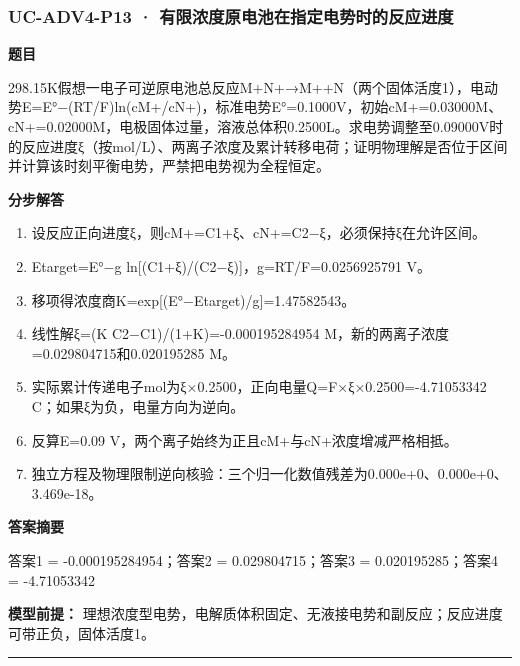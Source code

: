 \documentclass[UTF8,11pt,a4paper]{ctexart}
\begin{document}
\subsubsection*{UC-ADV4-P13 · 有限浓度原电池在指定电势时的反应进度}
\noindent\textbf{题目}\par
298.15K假想一电子可逆原电池总反应M+N+→M++N（两个固体活度1），电动势E=E°−(RT/F)ln(cM+/cN+)，标准电势E°=0.1000V，初始cM+=0.03000M、cN+=0.02000M，电极固体过量，溶液总体积0.2500L。求电势调整至0.09000V时的反应进度ξ（按mol/L）、两离子浓度及累计转移电荷；证明物理解是否位于区间并计算该时刻平衡电势，严禁把电势视为全程恒定。\par
\medskip\noindent\textbf{分步解答}
\begin{enumerate}
\item 设反应正向进度ξ，则cM+=C1+ξ、cN+=C2−ξ，必须保持ξ在允许区间。
\item Etarget=E°−g ln[(C1+ξ)/(C2−ξ)]，g=RT/F=0.0256925791 V。
\item 移项得浓度商K=exp[(E°−Etarget)/g]=1.47582543。
\item 线性解ξ=(K C2−C1)/(1+K)=-0.000195284954 M，新的两离子浓度=0.029804715和0.020195285 M。
\item 实际累计传递电子mol为ξ×0.2500，正向电量Q=F×ξ×0.2500=-4.71053342 C；如果ξ为负，电量方向为逆向。
\item 反算E=0.09 V，两个离子始终为正且cM+与cN+浓度增减严格相抵。
\item 独立方程及物理限制逆向核验：三个归一化数值残差为0.000e+0、0.000e+0、3.469e-18。
\end{enumerate}
\noindent\textbf{答案摘要}\par
答案1 = -0.000195284954；答案2 = 0.029804715；答案3 = 0.020195285；答案4 = -4.71053342\par
\noindent\textbf{模型前提：}
理想浓度型电势，电解质体积固定、无液接电势和副反应；反应进度可带正负，固体活度1。\par
\medskip\hrule\medskip
{}
\end{document}
